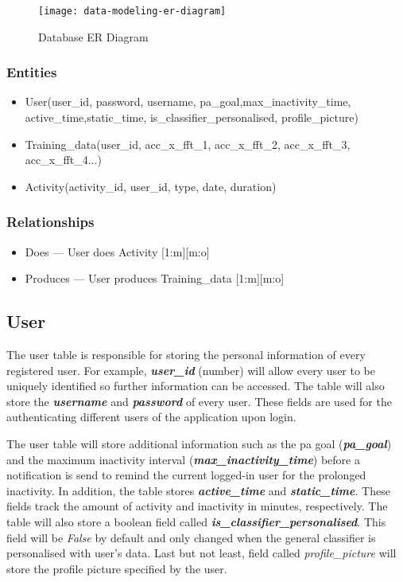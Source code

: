         \begin{figure}[ht]
            \centering
            \texttt{[image: data-modeling-er-diagram]}
            \caption{Database ER Diagram}
            \label{fig:data_modeling_er_diagram}
        \end{figure}
        
        \subsubsection{Entities}
        
        \begin{itemize}
            \item User(user\_id, password, username, pa\_goal,max\_inactivity\_time, active\_time,\newline static\_time, is\_classifier\_personalised, profile\_picture)
            \item Training\_data(user\_id, acc\_x\_fft\_1, acc\_x\_fft\_2, acc\_x\_fft\_3, acc\_x\_fft\_4...)
            \item Activity(activity\_id, user\_id, type, date, duration)
        \end{itemize}
        
        \subsubsection{Relationships}
        \begin{itemize}
        \item Does --- User does Activity [1:m][m:o]
        \item Produces --- User produces Training\_data [1:m][m:o]
        \end{itemize}
        
        \subsection{User}
        The user table is responsible for storing the personal information of every registered user. For example, \textbf{\textit{user\_id}} (number) will allow every user to be uniquely identified so further information can be accessed. The table will also store the \textbf{\textit{username}} and \textbf{\textit{password}} of every user. These fields are used for the authenticating different users of the application upon login.
        
        The user table will store additional information such as the \gls{pa} goal (\textbf{\textit{pa\_goal}}) and the maximum inactivity interval (\textbf{\textit{max\_inactivity\_time}}) before a notification is send to remind the current logged-in user for the prolonged inactivity. In addition, the table stores \textbf{\textit{active\_time}} and \textbf{\textit{static\_time}}. These fields track the amount of activity and inactivity in minutes, respectively. The table will also store a boolean field called \textbf{\textit{is\_classifier\_personalised}}. This field will be \textit{False} by default and only changed when the general classifier is personalised with user's data. Last but not least, field called \textit{profile\_picture} will store the profile picture specified by the user.
        
